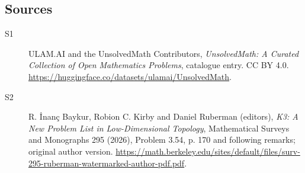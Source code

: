 \documentclass[11pt]{article}
\begin{document}
\subsection{Sources}
\begin{description}
\item[\hypertarget{source:statement:1}{S1}] ULAM.AI and the UnsolvedMath Contributors, \emph{UnsolvedMath: A Curated Collection of Open Mathematics Problems}, catalogue entry. CC BY 4.0. \url{https://huggingface.co/datasets/ulamai/UnsolvedMath}.
\item[\hypertarget{source:statement:2}{S2}] R. İnanç Baykur, Robion C. Kirby and Daniel Ruberman (editors), \emph{K3: A New Problem List in Low-Dimensional Topology}, Mathematical Surveys and Monographs 295 (2026), Problem 3.54, p. 170 and following remarks; original author version. \url{https://math.berkeley.edu/sites/default/files/surv-295-ruberman-watermarked-author-pdf.pdf}.
\end{description}
\label{end:statement}
\end{document}
